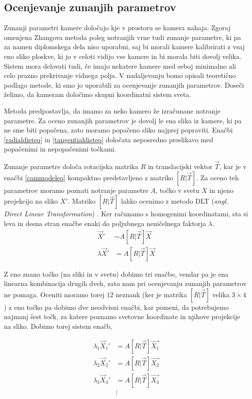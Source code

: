 \documentclass[a4paper, 12pt]{book}
\begin{document}
\subsection{Ocenjevanje zunanjih parametrov}\label{externalparamssection}
Zunanji parametri kamere določajo kje v prostoru se kamera nahaja. Zgoraj omenjena Zhangova metoda poleg notranjih vrne tudi zunanje parametre, ki pa za namen diplomskega dela niso uporabni, saj bi morali kamere kalibrirati z vsaj eno sliko ploskve, ki jo v celoti vidijo vse kamere in bi morala biti dovolj velika. Sistem mora delovati tudi, če imajo nekatere kamere med seboj minimalno ali celo prazno prekrivanje vidnega polja. V nadaljevanju bomo opisali teoretično podlago metode, ki smo jo uporabili za ocenjevanje zunanjih parametrov. Doseči želimo, da kameram določimo skupni koordinatni sistem sveta.

Metoda predpostavlja, da imamo za neko kamero že izračunane notranje parametre. Za oceno zunanjih parametrov je dovolj le ena slika iz kamere, ki pa ne sme biti popačena, zato moramo popačeno sliko najprej popraviti. Enačbi \eqref{radialdisteq} in \eqref{tangentialdisteq} določata neposredno preslikavo med popačenimi in nepopačenimi točkami. 

Zunanje parametre določa rotacijska matrika $R$ in translacijski vektor $\vec{T}$, kar je v enačbi \eqref{cammodeleq} kompaktno predstavljeno z matriko $[R | \vec{T}]$. Za oceno teh parametrov moramo poznati notranje parametre $A$, točko v svetu $X$ in njeno projekcijo na sliko $X'$. Matriko $[R | \vec{T}]$ lahko ocenimo z metodo DLT (\emph{angl. Direct Linear Transformation}) \cite{Hartley2004}. Ker računamo s homogenimi koordinatami, sta si leva in desna stran enačbe enaki do poljubnega neničelnega faktorja $\lambda$.
\begin{align}
\vec{X}' &\sim A[R | \vec{T}] \vec{X} \label{cammodeleq} \\
\lambda \vec{X}' &= A[R | \vec{T}] \vec{X} \label{lambdaeq}
\end{align}

Z eno znano točko (na sliki in v svetu) dobimo tri enačbe, vendar pa je ena linearna kombinacija drugih dveh, zato nam pri ocenjevanju zunanjih parametrov ne pomaga. Oceniti moramo torej $12$ neznank (ker je matrika $[R | \vec{T}]$ velika $3 \times 4$) z eno točko pa dobimo dve neodvisni enačbi, kar pomeni, da potrebujemo najmanj šest točk, za katere poznamo svetovne koordinate in njihove projekcije na sliko. Dobimo torej sistem enačb,

\begin{align*}
\lambda_1 \vec{X}_1' &= A[R | \vec{T}] \vec{X_1} \\
\lambda_2 \vec{X}_2' &= A[R | \vec{T}] \vec{X_2} \\
\lambda_3 \vec{X}_3' &= A[R | \vec{T}] \vec{X_3} \\
&\vdots
\end{align*}
\end{document}
